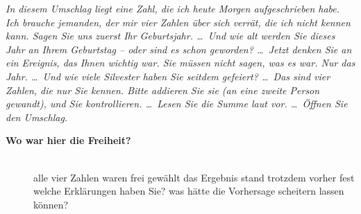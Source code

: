 \begin{lehrhinweis}
\itshape
In diesem Umschlag liegt eine Zahl, die ich heute Morgen aufgeschrieben
habe. Ich brauche jemanden, der mir vier Zahlen über sich verrät, die ich
nicht kennen kann. Sagen Sie uns zuerst Ihr Geburtsjahr. \dots\ Und wie alt
werden Sie dieses Jahr an Ihrem Geburtstag -- oder sind es schon
geworden? \dots\ Jetzt denken Sie an ein Ereignis, das Ihnen wichtig war.
Sie müssen nicht sagen, was es war. Nur das Jahr. \dots\ Und wie viele
Silvester haben Sie seitdem gefeiert? \dots\ Das sind vier Zahlen, die nur
Sie kennen. Bitte addieren Sie sie (an eine zweite Person gewandt), und
Sie kontrollieren. \dots\ Lesen Sie die Summe laut vor. \dots\ Öffnen Sie
den Umschlag.
\end{lehrhinweis}

\begin{description}
\item[{\rot\bf Wo war hier die Freiheit?}]~\\[-\lblskip]
\bi
  \ite alle vier Zahlen waren frei gewählt
  \ite das Ergebnis stand trotzdem vorher fest
  \ite welche Erklärungen haben Sie?
  \ite was hätte die Vorhersage scheitern lassen können?
\ei
\os{\newpage}
\end{description}

